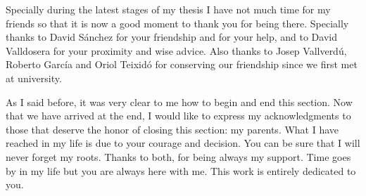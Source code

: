 Specially during the latest stages of my thesis I have not much time for my friends 
so that it is now a good moment to thank you for being there. Specially thanks to David 
S\'anchez for your friendship and for your help, and to David Valldosera for your 
proximity and wise advice. Also thanks to Josep Vallverd\'u, Roberto Garc\'ia 
and Oriol Teixid\'o for conserving our friendship since we first met at university. 

As I said before, it was very clear to me how to begin and end this section. Now that
we have arrived at the end, I would like to express my acknowledgments to those that deserve 
the honor of closing this section: my parents. What I have reached in my life is
due to your courage and decision. You can be sure that I will never forget my roots.
Thanks to both, for being always my support. Time goes by in my life but you 
are always here with me. This work is entirely dedicated to you.

